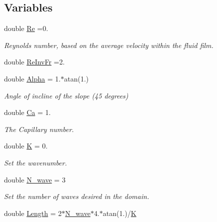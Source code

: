 \subsection*{Variables}
\begin{DoxyCompactItemize}
\item 
double \hyperlink{namespaceGlobal__Physical__Variables_ab814e627d2eb5bc50318879d19ab16b9}{Re} =0.
\begin{DoxyCompactList}\small\item\em Reynolds number, based on the average velocity within the fluid film. \end{DoxyCompactList}\item 
double \hyperlink{namespaceGlobal__Physical__Variables_aa6286f02b476912dd7550eced538331a}{Re\+Inv\+Fr} =2.
\item 
double \hyperlink{namespaceGlobal__Physical__Variables_aa2e802ee7cc8e1ac900ba94c3ce86eb7}{Alpha} = 1.$\ast$atan(1.)
\begin{DoxyCompactList}\small\item\em Angle of incline of the slope (45 degrees) \end{DoxyCompactList}\item 
double \hyperlink{namespaceGlobal__Physical__Variables_a8b32b93d2e546f9375ec418474107838}{Ca} = 1.
\begin{DoxyCompactList}\small\item\em The Capillary number. \end{DoxyCompactList}\item 
double \hyperlink{namespaceGlobal__Physical__Variables_a9da8be10d9e20eb0329af7fd8d6e0e98}{K} = 0.
\begin{DoxyCompactList}\small\item\em Set the wavenumber. \end{DoxyCompactList}\item 
double \hyperlink{namespaceGlobal__Physical__Variables_adf0e913323310713bf58ec469fb586e6}{N\+\_\+wave} = 3
\begin{DoxyCompactList}\small\item\em Set the number of waves desired in the domain. \end{DoxyCompactList}\item 
double \hyperlink{namespaceGlobal__Physical__Variables_a987847160c3cfad8977836291fb9d0e0}{Length} = 2$\ast$\hyperlink{namespaceGlobal__Physical__Variables_adf0e913323310713bf58ec469fb586e6}{N\+\_\+wave}$\ast$4.$\ast$atan(1.)/\hyperlink{namespaceGlobal__Physical__Variables_a9da8be10d9e20eb0329af7fd8d6e0e98}{K}

\end{DoxyCompactItemize}
